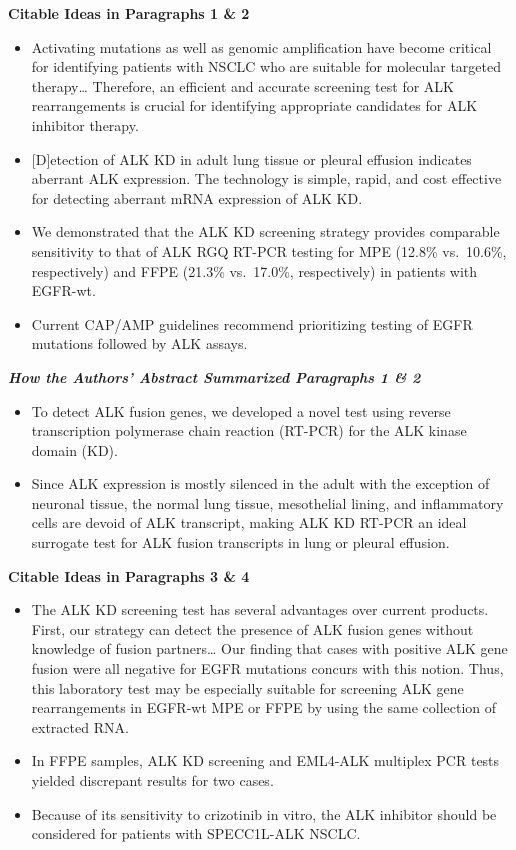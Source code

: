\documentclass[
]{book}
\providecommand{\tightlist}{%
  \setlength{\itemsep}{0pt}\setlength{\parskip}{0pt}}
\begin{document}
\textbf{Citable Ideas in Paragraphs 1 \& 2}

\begin{itemize}
\tightlist
\item
  Activating mutations as well as genomic amplification have become critical for identifying patients with NSCLC who are suitable for molecular targeted therapy\ldots{} Therefore, an efficient and accurate screening test for ALK rearrangements is crucial for identifying appropriate candidates for ALK inhibitor therapy.
\item
  {[}D{]}etection of ALK KD in adult lung tissue or pleural effusion indicates aberrant ALK expression. The technology is simple, rapid, and cost effective for detecting aberrant mRNA expression of ALK KD.
\item
  We demonstrated that the ALK KD screening strategy provides comparable sensitivity to that of ALK RGQ RT-PCR testing for MPE (12.8\% vs.~10.6\%, respectively) and FFPE (21.3\% vs.~17.0\%, respectively) in patients with EGFR-wt.
\item
  Current CAP/AMP guidelines recommend prioritizing testing of EGFR mutations followed by ALK assays.
\end{itemize}

\textbf{\emph{How the Authors' Abstract Summarized Paragraphs 1 \& 2}}

\begin{itemize}
\tightlist
\item
  To detect ALK fusion genes, we developed a novel test using reverse transcription polymerase chain reaction (RT-PCR) for the ALK kinase domain (KD).
\item
  Since ALK expression is mostly silenced in the adult with the exception of neuronal tissue, the normal lung tissue, mesothelial lining, and inflammatory cells are devoid of ALK transcript, making ALK KD RT-PCR an ideal surrogate test for ALK fusion transcripts in lung or pleural effusion.
\end{itemize}

\textbf{Citable Ideas in Paragraphs 3 \& 4}

\begin{itemize}
\tightlist
\item
  The ALK KD screening test has several advantages over current products. First, our strategy can detect the presence of ALK fusion genes without knowledge of fusion partners\ldots{} Our finding that cases with positive ALK gene fusion were all negative for EGFR mutations concurs with this notion. Thus, this laboratory test may be especially suitable for screening ALK gene rearrangements in EGFR-wt MPE or FFPE by using the same collection of extracted RNA.
\item
  In FFPE samples, ALK KD screening and EML4-ALK multiplex PCR tests yielded discrepant results for two cases.
\item
  Because of its sensitivity to crizotinib in vitro, the ALK inhibitor should be considered for patients with SPECC1L-ALK NSCLC.
\end{itemize}
\end{document}
